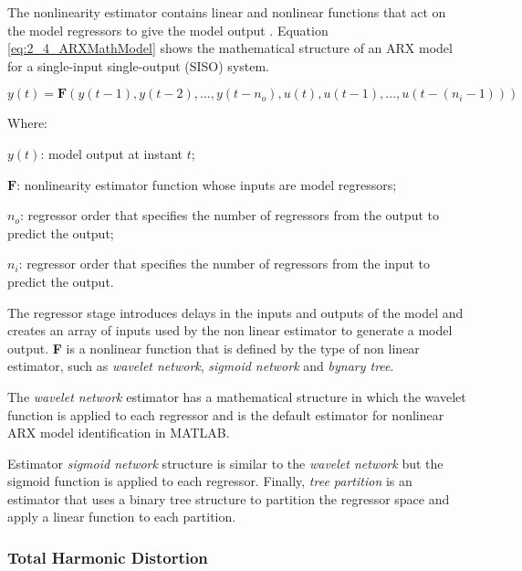The nonlinearity estimator contains linear and nonlinear functions that act on the model regressors to give the model output \cite{IdtToolbox}. Equation \ref{eq:2_4_ARXMathModel} shows the mathematical structure of an ARX model for a single-input single-output (SISO) system.

\begin{equation}
\label{eq:2_4_ARXMathModel}
y(t) = \textbf{F}(y(t-1),y(t-2),...,y(t-n_o),u(t),u(t-1),...,u(t-(n_i-1)))
\end{equation}

Where:

\begin{description}
	\item \hspace{20pt}$y(t)$: model output at instant $t$;
	\item \hspace{20pt}$\textbf{F}$: nonlinearity estimator function whose inputs are model regressors;
	\item \hspace{20pt}$n_o$: regressor order that specifies the number of regressors from the output to predict the output;
	\item \hspace{20pt}$n_i$: regressor order that specifies the number of regressors from the input to predict the output.
\end{description}

The regressor stage introduces delays in the inputs and outputs of the model and creates an array of inputs used by the non linear estimator to generate a model output. \textbf{F} is a nonlinear function that is defined by the type of non linear estimator, such as \textit{wavelet network}, \textit{sigmoid network} and \textit{bynary tree}.

The \textit{wavelet network} estimator has a mathematical structure in which the wavelet function is applied to each regressor and is the default estimator for nonlinear ARX model identification in MATLAB. 

Estimator \textit{sigmoid network} structure is similar to the \textit{wavelet network} but the sigmoid function is applied to each regressor. Finally, \textit{tree partition} is an estimator that uses a binary tree structure to partition the regressor space and apply a linear function to each partition.

\subsubsection{Total Harmonic Distortion}

